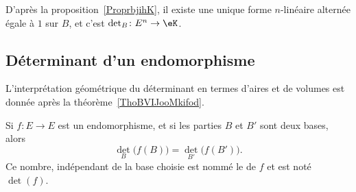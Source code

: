 D'après la proposition~\ref{ProprbjihK}, il existe une unique forme \( n\)-linéaire alternée égale à \( 1\) sur \( B\), et c'est \( \det_B\colon E^n\to \eK\).

\subsection{Déterminant d'un endomorphisme}

L'interprétation géométrique du déterminant en termes d'aires et de volumes est donnée après la théorème~\ref{ThoBVIJooMkifod}.

\begin{lemmaDef}       \label{LEMooQTRVooAKzucd}      \label{DefCOZEooGhRfxA}
    Si \( f\colon E\to E\) est un endomorphisme, et si les parties \( B\) et \( B'\) sont deux bases, alors 
    \begin{equation}
        \det_B\big( f(B) \big)=\det_{B'}\big( f(B') \big).
    \end{equation}
    Ce nombre, indépendant de la base choisie est nommé le  de \( f\) et est noté \( \det(f)\).
\end{lemmaDef}

